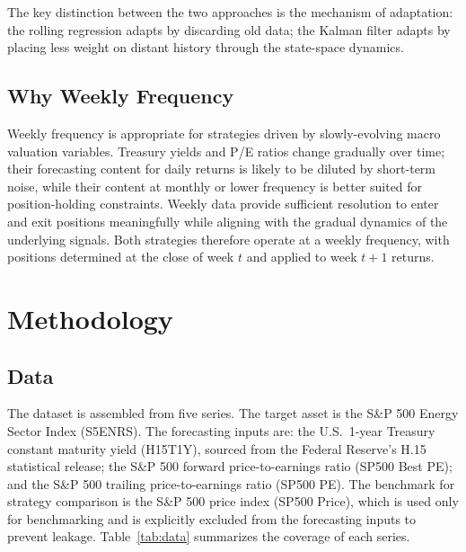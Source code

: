\documentclass[12pt]{article}
\begin{document}
The key distinction between the two approaches is the mechanism of adaptation: the rolling regression adapts by discarding old data; the Kalman filter adapts by placing less weight on distant history through the state-space dynamics.

\subsection{Why Weekly Frequency}

Weekly frequency is appropriate for strategies driven by slowly-evolving macro valuation variables. Treasury yields and P/E ratios change gradually over time; their forecasting content for daily returns is likely to be diluted by short-term noise, while their content at monthly or lower frequency is better suited for position-holding constraints. Weekly data provide sufficient resolution to enter and exit positions meaningfully while aligning with the gradual dynamics of the underlying signals. Both strategies therefore operate at a weekly frequency, with positions determined at the close of week $t$ and applied to week $t+1$ returns.

\section{Methodology}
\label{sec:methodology}

\subsection{Data}

The dataset is assembled from five series. The target asset is the S\&P 500 Energy Sector Index (S5ENRS). The forecasting inputs are: the U.S.\ 1-year Treasury constant maturity yield (H15T1Y), sourced from the Federal Reserve's H.15 statistical release; the S\&P 500 forward price-to-earnings ratio (SP500 Best PE); and the S\&P 500 trailing price-to-earnings ratio (SP500 PE). The benchmark for strategy comparison is the S\&P 500 price index (SP500 Price), which is used only for benchmarking and is explicitly excluded from the forecasting inputs to prevent leakage. Table~\ref{tab:data} summarizes the coverage of each series.
\end{document}
